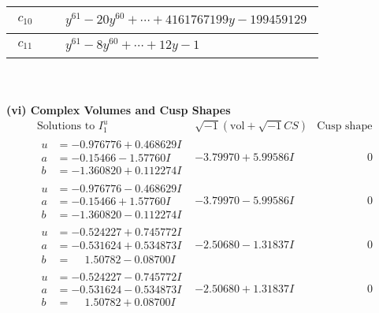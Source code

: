 \documentclass[1p]{elsarticle_modified}
\theoremstyle{definition}
\newcommand{\I}{\sqrt{-1}}
\begin{document}
\begin{tabular}{m{50pt}|m{274pt}}
\hline $$\begin{aligned}c_{10}\end{aligned}$$&$\begin{aligned}
&y^{61}-20 y^{60}+\cdots+4161767199 y-199459129
\end{aligned}$\\
\hline $$\begin{aligned}c_{11}\end{aligned}$$&$\begin{aligned}
&y^{61}-8 y^{60}+\cdots+12 y-1
\end{aligned}$\\
\hline
\end{tabular}\\~\\
\newpage\flushleft \textbf{(vi) Complex Volumes and Cusp Shapes}
$$\begin{array}{c|c|c}  
\text{Solutions to }I^u_{1}& \I (\text{vol} + \sqrt{-1}CS) & \text{Cusp shape}\\
 \hline 
\begin{aligned}
u &= -0.976776 + 0.468629 I \\
a &= -0.15466 - 1.57760 I \\
b &= -1.360820 + 0.112274 I\end{aligned}
 & -3.79970 + 5.99586 I & \phantom{-0.000000 } 0 \\ \hline\begin{aligned}
u &= -0.976776 - 0.468629 I \\
a &= -0.15466 + 1.57760 I \\
b &= -1.360820 - 0.112274 I\end{aligned}
 & -3.79970 - 5.99586 I & \phantom{-0.000000 } 0 \\ \hline\begin{aligned}
u &= -0.524227 + 0.745772 I \\
a &= -0.531624 + 0.534873 I \\
b &= \phantom{-}1.50782 - 0.08700 I\end{aligned}
 & -2.50680 - 1.31837 I & \phantom{-0.000000 } 0 \\ \hline\begin{aligned}
u &= -0.524227 - 0.745772 I \\
a &= -0.531624 - 0.534873 I \\
b &= \phantom{-}1.50782 + 0.08700 I\end{aligned}
 & -2.50680 + 1.31837 I & \phantom{-0.000000 } 0 \\ \hline\begin{aligned}

\end{aligned}
\end{array}$$
\end{document}
